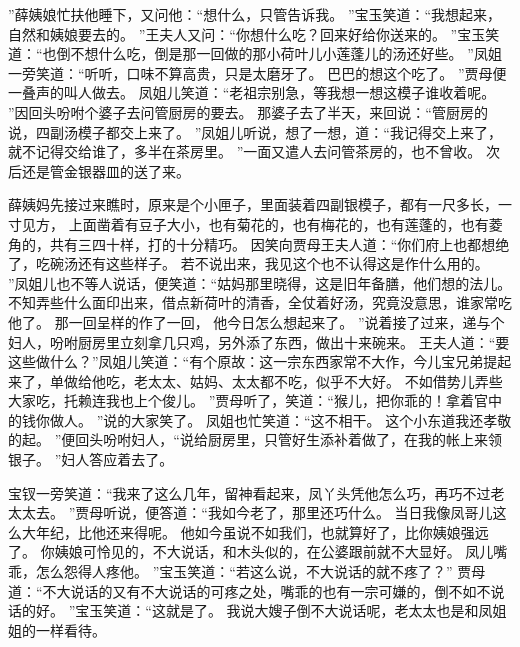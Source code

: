 ”薛姨娘忙扶他睡下，又问他：“想什么，只管告诉我。
”宝玉笑道：“我想起来，自然和姨娘要去的。
”王夫人又问：“你想什么吃？回来好给你送来的。
”宝玉笑道：“也倒不想什么吃，倒是那一回做的那小荷叶儿小莲蓬儿的汤还好些。
”凤姐一旁笑道：“听听，口味不算高贵，只是太磨牙了。
巴巴的想这个吃了。
”贾母便一叠声的叫人做去。
凤姐儿笑道：“老祖宗别急，等我想一想这模子谁收着呢。
”因回头吩咐个婆子去问管厨房的要去。
那婆子去了半天，来回说：“管厨房的说，四副汤模子都交上来了。
”凤姐儿听说，想了一想，道：“我记得交上来了，就不记得交给谁了，多半在茶房里。
”一面又遣人去问管茶房的，也不曾收。
次后还是管金银器皿的送了来。
\par
薛姨妈先接过来瞧时，原来是个小匣子，里面装着四副银模子，都有一尺多长，一寸见方，
上面凿着有豆子大小，也有菊花的，也有梅花的，也有莲蓬的，也有菱角的，共有三四十样，打的十分精巧。
因笑向贾母王夫人道：“你们府上也都想绝了，吃碗汤还有这些样子。
若不说出来，我见这个也不认得这是作什么用的。
”凤姐儿也不等人说话，便笑道：“姑妈那里晓得，这是旧年备膳，他们想的法儿。
不知弄些什么面印出来，借点新荷叶的清香，全仗着好汤，究竟没意思，谁家常吃他了。
那一回呈样的作了一回，
他今日怎么想起来了。
”说着接了过来，递与个妇人，吩咐厨房里立刻拿几只鸡，另外添了东西，做出十来碗来。
王夫人道：“要这些做什么？”凤姐儿笑道：“有个原故：这一宗东西家常不大作，今儿宝兄弟提起来了，单做给他吃，老太太、姑妈、太太都不吃，似乎不大好。
不如借势儿弄些大家吃，托赖连我也上个俊儿。
”贾母听了，笑道：“猴儿，把你乖的！拿着官中的钱你做人。
”说的大家笑了。
凤姐也忙笑道：“这不相干。
这个小东道我还孝敬的起。
”便回头吩咐妇人，“说给厨房里，只管好生添补着做了，在我的帐上来领银子。
”妇人答应着去了。
\par
宝钗一旁笑道：“我来了这么几年，留神看起来，凤丫头凭他怎么巧，再巧不过老太太去。
”贾母听说，便答道：“我如今老了，那里还巧什么。
当日我像凤哥儿这么大年纪，比他还来得呢。
他如今虽说不如我们，也就算好了，比你姨娘强远了。
你姨娘可怜见的，不大说话，和木头似的，在公婆跟前就不大显好。
凤儿嘴乖，怎么怨得人疼他。
”宝玉笑道：“若这么说，不大说话的就不疼了？”
贾母道：“不大说话的又有不大说话的可疼之处，嘴乖的也有一宗可嫌的，倒不如不说话的好。
”宝玉笑道：“这就是了。
我说大嫂子倒不大说话呢，老太太也是和凤姐姐的一样看待。
